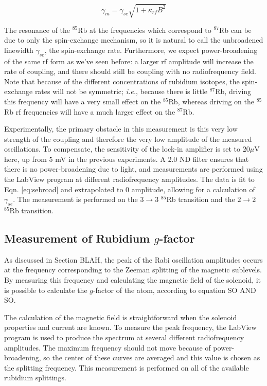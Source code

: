 \begin{equation}
\gamma_{m} = \gamma_{se} \sqrt{1+\kappa_{rf} B^{2}} \label{eq:sebroad}
\end{equation}

The resonance of the $^{85}$Rb at the frequencies which correspond to $^{87}$Rb can be due to only the spin-exchange mechanism, so it is natural to call the unbroadened linewidth $\gamma_{se}$, the spin-exchange rate. Furthermore, we expect power-broadening of the same rf form as we've seen before: a larger rf amplitude will increase the rate of coupling, and there should still be coupling with no radiofrequency field. Note that because of the different concentrations of rubidium isotopes, the spin-exchange rates will not be symmetric; \emph{i.e.}, because there is little  $^{87}$Rb, driving this frequency will have a very small effect on the $^{85}$Rb, whereas driving on the  $^{85}$Rb rf frequencies will have a much larger effect on the  $^{87}$Rb.

Experimentally, the primary obstacle in this measurement is this very low strength of the coupling and therefore the very low amplitude of the measured oscillations. To compensate, the sensitivity of the lock-in amplifier is set to $20 \mu$V here, up from $5$ mV in the previous experiments. A 2.0 ND filter ensures that there is no power-broadening due to light, and measurements are performed using the LabView program at different radiofrequency amplitudes. The data is fit to Eqn. \ref{eq:sebroad} and extrapolated to 0 amplitude, allowing for a calculation of $\gamma_{se}$. The measurement is performed on the $3\rightarrow3$  $^{85}$Rb transition and the $2\rightarrow2$ $^{85}$Rb transition. 

\subsection{Measurement of Rubidium $g$-factor}

As discussed in Section BLAH, the peak of the Rabi oscillation amplitudes occurs at the frequency corresponding to the Zeeman splitting of the magnetic sublevels. By measuring this frequency and calculating the magnetic field of the solenoid, it is possible to calculate the $g$-factor of the atom, according to equation SO AND SO.

The calculation of the magnetic field is straightforward when the solenoid properties and current are known. To measure the peak frequency, the LabView program is used to produce the spectrum at several different radiofrequency amplitudes. The maximum frequency should not move because of power-broadening, so the center of these curves are averaged and this value is chosen as the splitting frequency. This measurement is performed on all of the available rubidium splittings.











